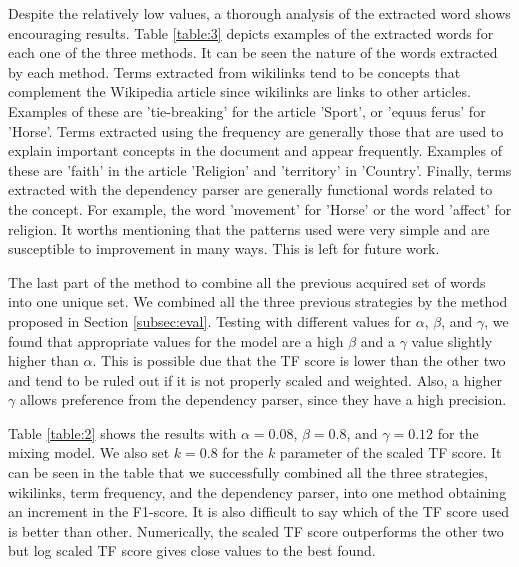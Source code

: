 \documentclass[oribibl]{llncs}
\begin{document}
Despite the relatively low values, a thorough analysis of the extracted word shows encouraging results. Table \ref{table:3} depicts examples of the extracted words for each one of the three methods. It can be seen the nature of the words extracted by each method. Terms extracted from wikilinks tend to be concepts that complement the Wikipedia article since wikilinks are links to other articles. Examples of these are 'tie-breaking' for the article 'Sport', or 'equus ferus' for 'Horse'. Terms extracted using the frequency are generally those that are used to explain important concepts in the document and appear frequently. Examples of these are 'faith' in the article 'Religion' and 'territory' in 'Country'. Finally, terms extracted with the dependency parser are generally functional words related to the concept. For example, the word 'movement' for 'Horse' or the word 'affect' for religion. It worths mentioning that the patterns used were very simple and are susceptible to improvement in many ways. This is left for future work.

The last part of the method to combine all the previous acquired set of words into one unique set. We combined all the three previous strategies by the method proposed in Section \ref{subsec:eval}. Testing with different values for $\alpha$, $\beta$, and $\gamma$, we found that appropriate values for the model are a high $\beta$ and a $\gamma$ value slightly higher than $\alpha$. This is possible due that the TF score is lower than the other two and tend to be ruled out if it is not properly scaled and weighted. Also, a higher $\gamma$ allows preference from the dependency parser, since they have a high precision. 

Table \ref{table:2} shows the results with $\alpha = 0.08$, $\beta = 0.8$, and $\gamma = 0.12$ for the mixing model. We also set $k=0.8$ for the $k$ parameter of the scaled TF score. It can be seen in the table that we successfully combined all the three strategies, wikilinks, term frequency, and the dependency parser, into one method obtaining an increment in the F1-score. It is also difficult to say which of the TF score used is better than other. Numerically, the scaled TF score outperforms the other two but log scaled TF score gives close values to the best found. 
\end{document}
